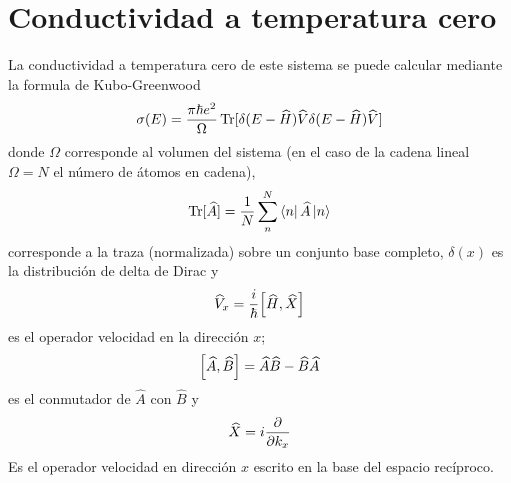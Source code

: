\section{Conductividad a temperatura cero}
	
La conductividad a temperatura cero de este sistema se puede calcular mediante la formula de Kubo-Greenwood \autocite{Greenwood1958}
\begin{equation}\label{eq:KuboGreenwood}
	\sigma(E) = \frac{\pi \hbar e^2}{\Omega}\Trace[\delta(E - \widehat{H})\widehat{V}\delta(E - \widehat{H})\widehat{V}]
\end{equation}
donde $\Omega$ corresponde al volumen del sistema (en el caso de la cadena lineal $ \Omega = N $ el número de átomos en cadena), 
\begin{equation}\label{eq:trace}
	\Trace[\widehat{A}] = \frac{1}{N}\sum_n^N \bra{n}\widehat{A}\ket{n}
\end{equation}
corresponde a la traza (normalizada) sobre un conjunto base completo, $\delta(x)$ es la distribución de delta de Dirac y 
\begin{equation}\label{eq:VelocityOP}
	\widehat{V}_x = \frac{i}{\hbar} \comm{\widehat{H}}{\widehat{X}}
\end{equation}
es el operador velocidad en la dirección $x$; 
\begin{equation}\label{eq:comm}
	\comm{\widehat A}{\widehat B} = \widehat{A}\widehat{B} - \widehat{B}\widehat{A}
\end{equation}
es el conmutador de $\widehat{A}$ con $\widehat{B}$ y 
\begin{equation}\label{eq:positionOP}
	\widehat{X} = i \pdv{k_x}
\end{equation}
Es el operador velocidad en dirección $x$ escrito en la base del espacio recíproco.


